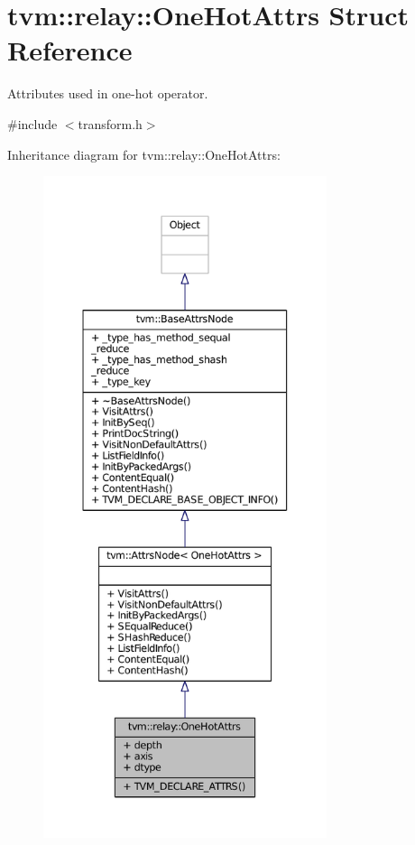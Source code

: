 \hypertarget{structtvm_1_1relay_1_1OneHotAttrs}{}\section{tvm\+:\+:relay\+:\+:One\+Hot\+Attrs Struct Reference}
\label{structtvm_1_1relay_1_1OneHotAttrs}


Attributes used in one-\/hot operator.  




{\ttfamily \#include $<$transform.\+h$>$}



Inheritance diagram for tvm\+:\+:relay\+:\+:One\+Hot\+Attrs\+:
\nopagebreak
\begin{figure}[H]
\begin{center}
\leavevmode
\includegraphics[height=550pt]{structtvm_1_1relay_1_1OneHotAttrs__inherit__graph}
\end{center}
\end{figure}



